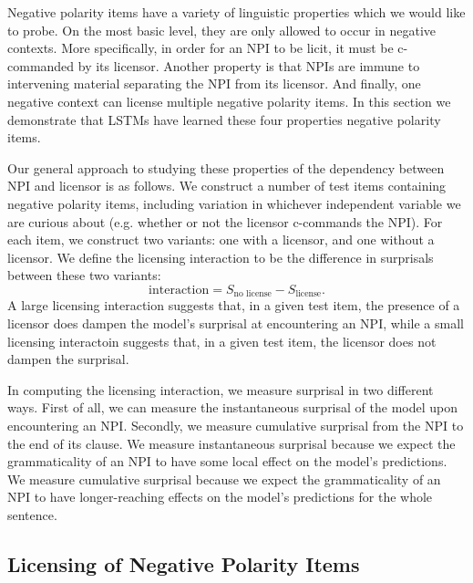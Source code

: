 \documentclass[11pt, round]{article}
\begin{document}
Negative polarity items have a variety of linguistic properties which we would like to probe. On the most basic level, they are only allowed to occur in negative contexts. More specifically, in order for an NPI to be licit, it must be c-commanded by its licensor. Another property is that NPIs are immune to intervening material separating the NPI from its licensor. And finally, one negative context can license multiple negative polarity items. In this section we demonstrate that LSTMs have learned these four properties negative polarity items.

Our general approach to studying these properties of the dependency between NPI and licensor is as follows. We construct a number of test items containing negative polarity items, including variation in whichever independent variable we are curious about (e.g. whether or not the licensor c-commands the NPI). For each item, we construct two variants: one with a licensor, and one without a licensor. We define the licensing interaction to be the difference in surprisals between these two variants:
\[ \textrm{interaction} = S_{\textrm{no license}} - S_{\textrm{license}}. \]
A large licensing interaction suggests that, in a given test item, the presence of a licensor does dampen the model's surprisal at encountering an NPI, while a small licensing interactoin suggests that, in a given test item, the licensor does not dampen the surprisal.

In computing the licensing interaction, we measure surprisal in two different ways. First of all, we can measure the instantaneous surprisal of the model upon encountering an NPI. Secondly, we measure cumulative surprisal from the NPI to the end of its clause. We measure instantaneous surprisal because we expect the grammaticality of an NPI to have some local effect on the model's predictions. We measure cumulative surprisal because we expect the grammaticality of an NPI to have longer-reaching effects on the model's predictions for the whole sentence.

\subsection{Licensing of Negative Polarity Items}
\label{sec:basic}
\end{document}
